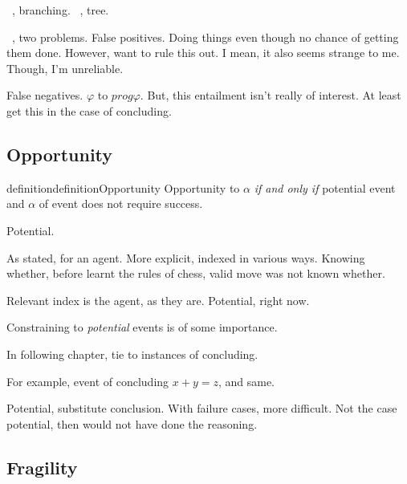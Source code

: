 \begin{note}
  ~\cite{Bonomi:1997uq}, branching.
  ~\cite{Szabo:2004ul}, tree.

  ~\cite{Szabo:2004ul}, two problems.
  False positives.
  Doing things even though no chance of getting them done.
  However, want to rule this out.
  I mean, it also seems strange to me.
  Though, I'm unreliable.

  False negatives.
  \(\varphi\) to \(prog \varphi\).
  But, this entailment isn't really of interest.
  At least get this in the case of concluding.
\end{note}



\subsection{Opportunity}
\label{sec:potential}


\begin{note}
  \begin{restatable}[Opportunity]{definition}{definitionOpportunity}
    Opportunity to \(\alpha\) \emph{if and only if} potential event and \(\alpha\) of event does not require success.
  \end{restatable}
\end{note}

\begin{note}
  Potential.

  As stated, for an agent.
  More explicit, indexed in various ways.
  Knowing whether, before learnt the rules of chess, valid move was not known whether.

  Relevant index is the agent, as they are.
  Potential, right now.
\end{note}

\begin{note}[Importance]
  Constraining  to \emph{potential} events is of some importance.

  In following chapter, tie  to instances of concluding.

  For example, event of concluding \(x + y = z\), and same.

  Potential, substitute conclusion.
  With failure cases, more difficult.
  Not the case potential, then would not have done the reasoning.
\end{note}

\subsection{Fragility}
\label{sec:fragility}

